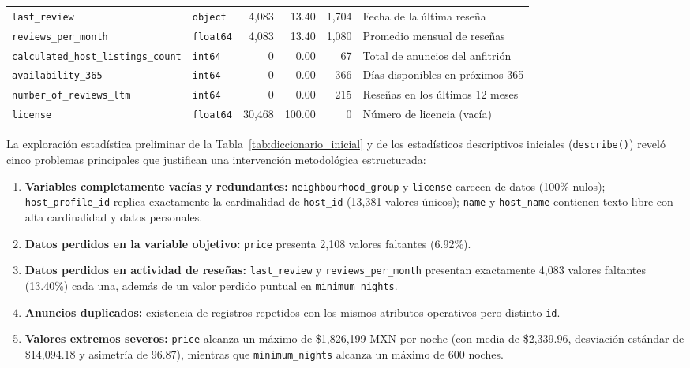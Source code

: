 \documentclass[12pt,letterpaper,oneside]{report}
\begin{document}
\begin{table}[htbp]
\begin{tabularx}{\textwidth}{l l r r r Y}
\texttt{last\_review}                   & \texttt{object}  &  4,083 &  13.40 &  1,704 & Fecha de la última reseña \\
\texttt{reviews\_per\_month}            & \texttt{float64} &  4,083 &  13.40 &  1,080 & Promedio mensual de reseñas \\
\texttt{calculated\_host\_listings\_count} & \texttt{int64} &    0 &   0.00 &     67 & Total de anuncios del anfitrión \\
\texttt{availability\_365}              & \texttt{int64}   &      0 &   0.00 &    366 & Días disponibles en próximos 365 \\
\texttt{number\_of\_reviews\_ltm}       & \texttt{int64}   &      0 &   0.00 &    215 & Reseñas en los últimos 12 meses \\
\texttt{license}                        & \texttt{float64} & 30,468 & 100.00 &      0 & Número de licencia (vacía) \\
\bottomrule
\end{tabularx}
\end{table}

La exploración estadística preliminar de la Tabla~\ref{tab:diccionario_inicial} y de los estadísticos descriptivos iniciales (\texttt{describe()}) reveló cinco problemas principales que justifican una intervención metodológica estructurada:

\begin{enumerate}[leftmargin=1.5em]
  \item \textbf{Variables completamente vacías y redundantes:} \texttt{neighbourhood\_group} y \texttt{license} carecen de datos (100\% nulos); \texttt{host\_profile\_id} replica exactamente la cardinalidad de \texttt{host\_id} (13,381 valores únicos); \texttt{name} y \texttt{host\_name} contienen texto libre con alta cardinalidad y datos personales.
  \item \textbf{Datos perdidos en la variable objetivo:} \texttt{price} presenta 2,108 valores faltantes (6.92\%).
  \item \textbf{Datos perdidos en actividad de reseñas:} \texttt{last\_review} y \texttt{reviews\_per\_month} presentan exactamente 4,083 valores faltantes (13.40\%) cada una, además de un valor perdido puntual en \texttt{minimum\_nights}.
  \item \textbf{Anuncios duplicados:} existencia de registros repetidos con los mismos atributos operativos pero distinto \texttt{id}.
  \item \textbf{Valores extremos severos:} \texttt{price} alcanza un máximo de \$1,826,199 MXN por noche (con media de \$2,339.96, desviación estándar de \$14,094.18 y asimetría de 96.87), mientras que \texttt{minimum\_nights} alcanza un máximo de 600 noches.
\end{enumerate}
\end{document}
